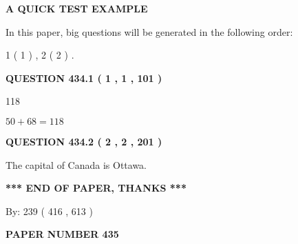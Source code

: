 \documentclass[12pt]{article}
\begin{document}
   
 \vspace{0.2in}
{\LARGE {\textbf{ A QUICK TEST EXAMPLE}}}
   
   
   
\vspace{0.2in}
   
In this paper, big questions will be generated in the following order: 
   
   
   1 ( 1 )
 ,
   2 ( 2 )
 .
  
\vspace{0.2in}
  
{\textbf{\Large{QUESTION
434.1 
 ( 1 , 1 , 101 )
}}}
  
  
 
 
\noindent{}

118
 
 
 
 
\noindent{}

$ %
50 +  %
68=   %
118$
 
 
  
\vspace{0.2in}
  
{\textbf{\Large{QUESTION
434.2 
 ( 2 , 2 , 201 )
}}}
  
  
 
 
\noindent{}
 
 
The capital of Canada is Ottawa.
 
 
 
 
   
   
 \vspace{0.2in}
 
   
   
   
   
\vspace{1.0in} 
{\textbf{\large{ *** END OF PAPER, THANKS *** }}} 
   
   
\hspace{1.0in} By: 
 239 ( 416 ,  613 )
   
   
   
   
\newpage 
\setcounter{page}{ 
   435001 } 
   
   
   
   
 {\textbf{ \Large{ PAPER NUMBER  435  }}}
   
   
\vspace{0.2in}
   
\end{document}
